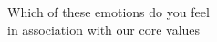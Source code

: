 \documentclass[preview]{standalone}
\begin{document}
\begin{center}
Which of these emotions do you feel \\ in association with our core values
\end{center}
\end{document}
